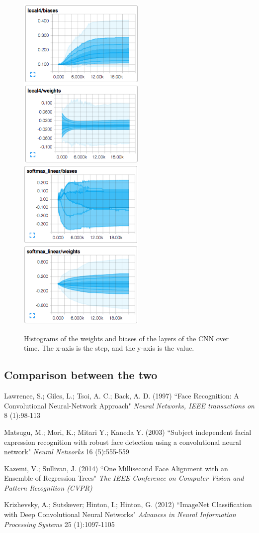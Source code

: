 \documentclass[10pt, twocolumn, twoside]{article}
\begin{document}
\begin{figure}
	\includegraphics[width=2.4in]{local4_params}
	\includegraphics[width=2.4in]{softmax_params}
	\caption{Histograms of the weights and biases of the layers of the CNN over time. The x-axis is the step, and the y-axis is the value.}
	\label{fig:params}
\end{figure}

\subsection{Comparison between the two}


\begin{thebibliography}{9}
Lawrence, S.; Giles, L.; Tsoi, A. C.; Back, A. D. (1997)
``Face Recognition: A Convolutional Neural-Network Approach"
\textit{Neural Networks, IEEE transactions on} 8 (1):98-113

Matsugu, M.; Mori, K.; Mitari Y.; Kaneda Y. (2003)
``Subject independent facial expression recognition with robust face detection using a convolutional neural network"
\textit{Neural Networks} 16 (5):555-559

Kazemi, V.; Sullivan, J. (2014)
``One Millisecond Face Alignment with an Ensemble of Regression Trees"
\textit{The IEEE Conference on Computer Vision and Pattern Recognition (CVPR)}

Krizhevsky, A.; Sutskever; Hinton, I.; Hinton, G. (2012)
``ImageNet Classification with Deep Convolutional Neural Networks"
\textit{Advances in Neural Information Processing Systems} 25 (1):1097-1105
\end{thebibliography}
\end{document}
